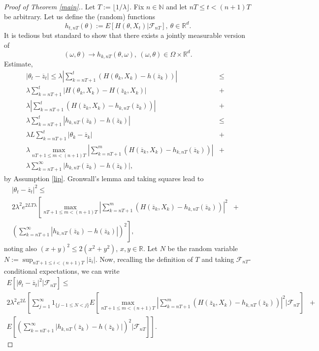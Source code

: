 \documentclass[a4paper,draft]{article}
\begin{document}
\begin{proof}[Proof of Theorem \ref{main}.] Let $T:=\lfloor 1/\lambda\rfloor$.
Fix $n\in\mathbb{N}$ and let $nT\leq t<(n+1)T$ be arbitrary.
Let us define the (random) functions
$$
h_{t,nT}(\theta):=
E[H(\theta,X_t)\vert\mathcal{F}_{nT}],\ \theta\in\mathbb{R}^d.
$$
It is tedious but standard to show that there exists a jointly measurable version of
$$
(\omega,\theta)\to h_{k,nT}(\theta,\omega),\
(\omega,\theta)\in\Omega\times \mathbb{R}^d.
$$
Estimate,
\begin{eqnarray*}
| \theta_{t}-\overline{z}_{t}| \leq \lambda \left\vert\sum_{k=nT+1}^t
\left(H(\theta_k,X_k)-h(\overline{z}_k)\right)\right\vert &\leq&\\
\lambda \sum_{k=nT+1}^t \vert
H(\theta_k,X_k)-H(\overline{z}_k,X_k)\vert
&+&\\
\lambda \left\vert\sum_{k=nT+1}^{t}
\left(H(\overline{z}_k,X_k)-h_{k,nT}(\overline{z}_k)\right) \right\vert &+&\\
\lambda \sum_{k=nT+1}^t
\left\vert h_{k,nT}(\overline{z}_k)- h(\overline{z}_k)\right\vert &\leq&\\
\lambda L \sum_{k=nT+1}^t |\theta_k-\overline{z}_k| &+&\\
\lambda
\max_{nT+1\leq m< (n+1)T} \left|\sum_{k=nT+1}^m \left(H(\overline{z}_k,X_k)-
h_{k,nT}(\overline{z}_k)\right)\right| &+&\\
\lambda \sum_{k=nT+1}^{\infty} \vert h_{k,nT}(\overline{z}_k)- h(\overline{z}_k)\vert, & &
\end{eqnarray*}
by Assumption \ref{lip}.
Gronwall's lemma and taking squares lead to
\begin{eqnarray*}
|\theta_{t}-\overline{z}_{t}|^2 \leq & & \\
2\lambda^2 e^{2LT\lambda}
\left[\max_{nT+1\leq m< (n+1)T} \left|\sum_{k=nT+1}^m \left(H(\overline{z}_k,X_k)-
h_{k,nT}(\overline{z}_k)\right)\right|^2 \right.
&+& \\
\left. \left(\sum_{k=nT+1}^{\infty} \left\vert h_{k,nT}(\overline{z}_k)- h(\overline{z}_k)\right\vert\right)^2\right], & &
\end{eqnarray*}
noting also $(x+y)^2\leq 2(x^2+y^2)$, $x,y\in\mathbb{R}$.
Let $N$ be the random variable
$N:=\sup_{nT+1\leq i< (n+1)T}|\overline{z}_i|$.
Now, recalling the definition of $T$ and taking $\mathcal{F}_{nT}$-conditional expectations, we can write
\begin{eqnarray*}
E\left[|\theta_{t}-\overline{z}_{t}|^2\vert\mathcal{F}_{nT}\right]
\leq & & \\
2\lambda^2 e^{2L}\left[\sum_{j=1}^{\infty}1_{\{j-1\leq N <j\}}
E\left[\max_{nT+1\leq m<(n+1)T} \left|\sum_{k=nT+1}^m \left(H(\overline{z}_k,X_k)-
h_{k,nT}(\overline{z}_k)\right)\right|^2 \vert\mathcal{F}_{nT}\right]\right.
&+& \\
\left. E\left[\left(\sum_{k=nT+1}^{\infty} \vert h_{k,nT}(\overline{z}_k)-
h(\overline{z}_k)\vert\right)^2\vert\mathcal{F}_{nT}\right]
\right]. & &
\end{eqnarray*}



\end{proof}
\end{document}
